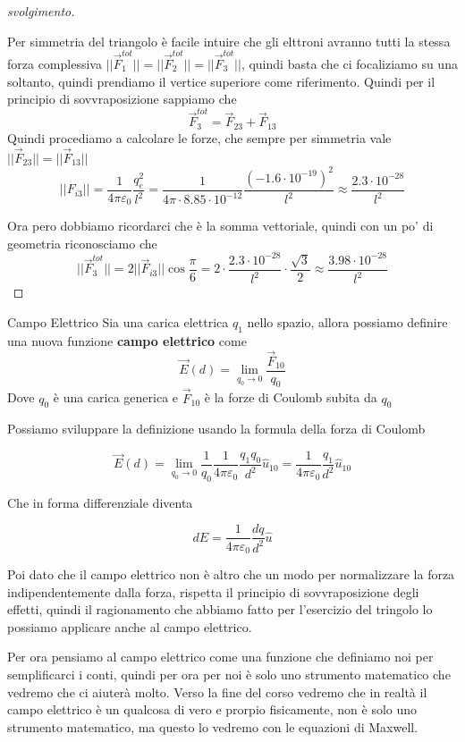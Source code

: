 \documentclass{rapport}
\begin{document}
\begin{proof}[svolgimento]
\begin{center}
\begin{tikzpicture}
\end{tikzpicture}
\end{center}


Per simmetria del triangolo è facile intuire che gli elttroni avranno tutti la stessa forza complessiva $||\vec{F}^{tot}_{1}|| = ||\vec{F}^{tot}_{2}|| = ||\vec{F}^{tot}_{3}||$, quindi basta che ci focaliziamo su una soltanto, quindi prendiamo il vertice superiore come riferimento. Quindi per il principio di sovvraposizione sappiamo che
\[
\vec{F}^{tot}_{3} = \vec{F}_{23} + \vec{F}_{13}
\]
Quindi procediamo a calcolare le forze, che sempre per simmetria vale $||\vec{F}_{23}||=||\vec{F}_{13}||$
\[
||F_{i3}|| = \dfrac{1}{4\pi \varepsilon_0} \dfrac{q_e^2}{l^2} = \dfrac{1}{4\pi \cdot 8.85\cdot 10^{-12}} \dfrac{(-1.6\cdot 10^{-19})^2   }{l^2} \approx  \dfrac{2.3\cdot 10^{-28}}{l^2}
\]

Ora pero dobbiamo ricordarci che è la somma vettoriale, quindi con un po' di geometria riconosciamo che 
\[
||\vec{F}^{tot}_3|| = 2||\vec{F}_{i3}||\cos\dfrac{\pi}{6} = 2 \cdot \dfrac{2.3\cdot 10^{-28}}{l^2} \cdot \dfrac{\sqrt{3}}{2} \approx \dfrac{3.98\cdot 10^{-28}}{l^2}
\]
\end{proof}


\newpage
\begin{definizione}{Campo Elettrico}{}
  Sia una carica elettrica $q_1$ nello spazio, allora possiamo definire una nuova funzione \textbf{campo elettrico} come 
  \[
  \vec{E}(d) = \lim_{q_0\to 0} \dfrac{\vec{F}_{10}}{q_0}
  \]
  Dove $q_0$ è una carica generica e $\vec{F}_{10}$ è la forze di Coulomb subita da $q_0$
\end{definizione}

Possiamo sviluppare la definizione usando la formula della forza di Coulomb


\[
  \vec{E}(d) =  \lim_{q_0\to 0} \dfrac{1}{q_0} \dfrac{1}{4\pi\varepsilon_0} \dfrac{q_1 q_0}{d^2}\hat{u}_{10} = \dfrac{1}{4\pi\varepsilon_0} \dfrac{q_1}{d^2} \hat{u}_{10}
\]


Che in forma differenziale diventa

\[
dE = \dfrac{1}{4\pi\varepsilon_0} \dfrac{dq}{d^2} \hat{u} 
\]

Poi dato che il campo elettrico non è altro che un modo per normalizzare la forza indipendentemente dalla forza, rispetta il principio di sovvraposizione degli effetti, quindi il ragionamento che abbiamo fatto per l'esercizio del tringolo lo possiamo applicare anche al campo elettrico.

Per ora pensiamo al campo elettrico come una funzione che definiamo noi per semplificarci i conti, quindi per ora per noi è solo uno strumento matematico che vedremo che ci aiuterà molto. Verso la fine del corso vedremo che in realtà il campo elettrico è un qualcosa di vero e prorpio fisicamente, non è solo uno strumento matematico, ma questo lo vedremo con le equazioni di Maxwell.
\end{document}
